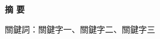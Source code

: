 {}
\begin{center}
  {\bfseries\chinnesesize 摘 要}
\end{center}

\zhlipsum[1][name=trad]

\noindent 關鍵詞：關鍵字一、關鍵字二、關鍵字三

\clearpage
